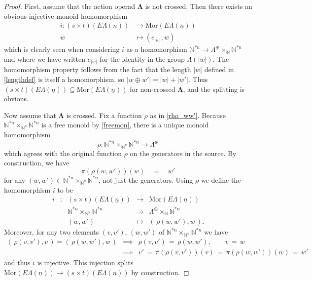 \documentclass{amsbook} %
\newcommand{\ML}{\mathbf{\Lambda}}
\newcommand{\lop}{\Lambda^{\oplus}}
\newcommand{\ELn}{E\Lambda(\underline{n})}
\numberwithin{section}{chapter}
\begin{document}
\begin{proof}
First, assume that the action operad $\ML$ is not crossed. Then there exists an obvious injective monoid homomorphism
\begin{align*}
i \colon (s \times t)(\ELn) &\rightarrow \mathrm{Mor}(\ELn) \\
w & \mapsto (e_{|w|}, w)
\end{align*}
which is clearly seen when considering $i$ as a homomorphism $\mathbb{N}^{\ast n} \rightarrow \lop \times_{\mathbb{N}} \mathbb{N}^{\ast n} $ and where we have written $e_{|w|}$ for the identity in the group $\Lambda(|w|)$. The homomorphism property follows from the fact that the length $|w|$ defined in \cref{lengthdef} is itself a homomorphism, so $|w \oplus w'| = |w|+|w'|$. Thus $(s \times t)(\ELn) \subseteq \mathrm{Mor}(\ELn)$ for non-crossed $\ML$, and the splitting is obvious.

Now assume that $\ML$ is crossed. Fix a function $\rho$ as in \cref{rho_ww'}. Because $\mathbb{N}^{\ast n} \times_{\mathbb{N}^n} \mathbb{N}^{\ast n}$ is a free monoid  by \cref{freemon}, there is a unique monoid homomorphism
\[ \rho \colon \mathbb{N}^{\ast n} \times_{\mathbb{N}^n} \mathbb{N}^{\ast n} \longrightarrow \lop \]
which agrees with the original function $\rho$ on the generators in the source. By construction, we have
\[ \pi(\rho(w, w'))(w) \quad = \quad w' \]
for any $(w, w') \in\mathbb{N}^{\ast n} \times_{\mathbb{N}^n} \mathbb{N}^{\ast n}$, not just the generators. Using $\rho$ we define the homomorphism $i$ to be
\[ \begin{array}{rlrll}
			i & \colon & (s \times t)(\ELn) & \to & \mathrm{Mor}(\ELn) \\
			&  & \mathbb{N}^{\ast n} \times_{\mathbb{N}^n} \mathbb{N}^{\ast n} & \to & \lop \times_{\mathbb{N}} \mathbb{N}^{\ast n} \\
			&  & (w, w') & \mapsto & ( \, \rho(w, w'), w \, ).
		\end{array}
\]
Moreover, for any two elements $(v, v')$, $(w, w')$ of $\mathbb{N}^{\ast n} \times_{\mathbb{N}^n} \mathbb{N}^{\ast n}$ we have
\[ \begin{array}{lcl}
		( \, \rho(v, v'), v \, )  =  ( \, \rho(w, w'), w \, ) & \implies & \rho(v, v') \, = \, \rho(w, w'), \quad \quad v \, = \, w \\
		 & \implies & v' \, = \, \pi(\rho(v, v'))(v) \, = \, \pi(\rho(w, w'))(w) \, = \, w'
		\end{array}
\]
and thus $i$ is injective. This injection splits $\mathrm{Mor}(\ELn) \to (s \times t)(\ELn)$ by construction.


\end{proof}
\end{document}
